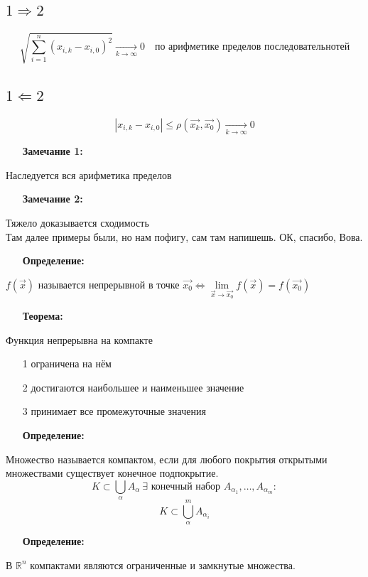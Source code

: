 \documentclass[12pt, letterpaper, twoside]{article}
\begin{document}
\subsection*{$1 \Rightarrow 2$}
$$\sqrt{\sum_{i = 1}^{n} (x_{i, k} - x_{i, 0})^2}\underset{k\to\infty}{\longrightarrow} 0\quad \text{по арифметике пределов последовательнотей}$$
\subsection*{$1 \Leftarrow 2$}
$$|x_{i, k} - x_{i, 0}| \leq \rho(\vec{x_k}, \vec{x_0})\underset{k\to\infty}{\longrightarrow} 0$$

\begin{enumerate}
    \item[\textbf{Замечание 1:}]
\end{enumerate}
Наследуется вся арифметика пределов
\begin{enumerate}
    \item[\textbf{Замечание 2:}]
\end{enumerate}
Тяжело доказывается сходимость\\

Там далее примеры были, но нам пофигу, сам там напишешь. ОК, спасибо, Вова.
\begin{enumerate}
    \item[\textbf{Определение:}]
\end{enumerate}
$f(\vec{x})$ называется непрерывной в точке $\vec{x_0} \Leftrightarrow\lim\limits_{\vec{x}\to \vec{x_0}}f(\vec{x}) = f(\vec{x_0})$
\begin{enumerate}
    \item[\textbf{Теорема:}]
\end{enumerate}
Функция непрерывна на компакте
\begin{enumerate}
    \item [1] ограничена на нём
    \item [2] достигаются наибольшее и наименьшее значение
    \item [3] принимает все промежуточные значения
\end{enumerate}
\begin{enumerate}
    \item[\textbf{Определение:}]
\end{enumerate}
Множество называется компактом, если для любого покрытия открытыми множествами существует конечное подпокрытие.
$$K \subset \bigcup_{\alpha}A_\alpha\ \exists \text{ конечный набор } A_{\alpha_1}, \dots, A_{\alpha_m}:$$
$$K \subset \bigcup_{\alpha}^mA_{\alpha_i}$$\newpage
\begin{enumerate}
    \item[\textbf{Определение:}]
\end{enumerate}
В $\mathbb{R}^n$ компактами являются ограниченные и замкнутые множества.
\end{document}
